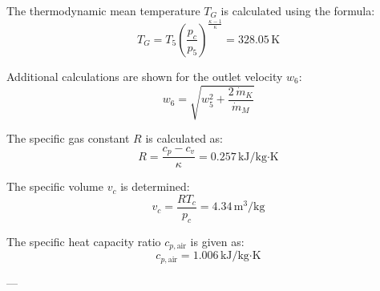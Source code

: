 The thermodynamic mean temperature \( T_G \) is calculated using the formula:  
\[
T_G = T_5 \left( \frac{p_c}{p_5} \right)^{\frac{\kappa - 1}{\kappa}} = 328.05 \, \text{K}
\]

Additional calculations are shown for the outlet velocity \( w_6 \):  
\[
w_6 = \sqrt{w_5^2 + \frac{2 \, \dot{m}_K}{\dot{m}_M}}
\]

The specific gas constant \( R \) is calculated as:  
\[
R = \frac{c_p - c_v}{\kappa} = 0.257 \, \text{kJ/kg·K}
\]

The specific volume \( v_c \) is determined:  
\[
v_c = \frac{R T_c}{p_c} = 4.34 \, \text{m}^3/\text{kg}
\]

The specific heat capacity ratio \( c_{p,\text{air}} \) is given as:  
\[
c_{p,\text{air}} = 1.006 \, \text{kJ/kg·K}
\]

---